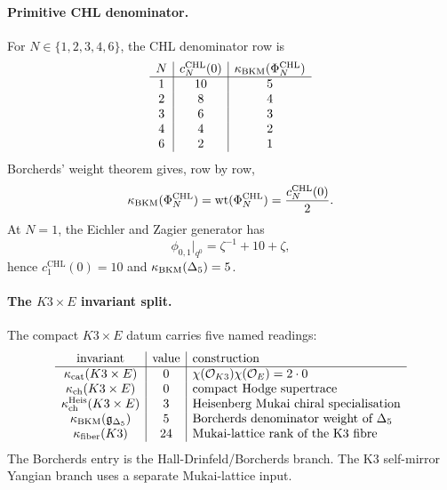 \paragraph{Primitive CHL denominator.}
For \(N\in\{1,2,3,4,6\}\), the CHL denominator row is
\[
\begin{array}{c|c|c}
N & c_N^{\mathrm{CHL}}(0) & \kappa_{\mathrm{BKM}}(\Phi_{N}^{\mathrm{CHL}})\\ \hline
1 & 10 & 5\\
2 & 8 & 4\\
3 & 6 & 3\\
4 & 4 & 2\\
6 & 2 & 1
\end{array}
\]
Borcherds' weight theorem gives, row by row,
\[
  \kappa_{\mathrm{BKM}}(\Phi_{N}^{\mathrm{CHL}})
  =
  \operatorname{wt}(\Phi_{N}^{\mathrm{CHL}})
  =
  \frac{c_N^{\mathrm{CHL}}(0)}2 .
\]
At \(N=1\), the Eichler and Zagier generator has
\[
  \phi_{0,1}\big|_{q^0}
  =
  \zeta^{-1}+10+\zeta,
\]
hence \(c_1^{\mathrm{CHL}}(0)=10\) and
\(\kappa_{\mathrm{BKM}}(\Delta_5)=5\).

\paragraph{The \(K3\times E\) invariant split.}
The compact \(K3\times E\) datum carries five named readings:
\[
\begin{array}{c|c|l}
\text{invariant} & \text{value} & \text{construction}\\ \hline
\kappa_{\mathrm{cat}}(K3\times E) & 0
& \chi(\mathcal O_{K3})\chi(\mathcal O_E)=2\cdot0\\
\kappa_{\mathrm{ch}}(K3\times E) & 0
& \text{compact Hodge supertrace}\\
\kappa_{\mathrm{ch}}^{\mathrm{Heis}}(K3\times E) & 3
& \text{Heisenberg Mukai chiral specialisation}\\
\kappa_{\mathrm{BKM}}(\mathfrak g_{\Delta_5}) & 5
& \text{Borcherds denominator weight of }\Delta_5\\
\kappa_{\mathrm{fiber}}(K3) & 24
& \text{Mukai-lattice rank of the K3 fibre}
\end{array}
\]
The Borcherds entry is the Hall-Drinfeld/Borcherds branch. The K3
self-mirror Yangian branch uses a separate Mukai-lattice input.

